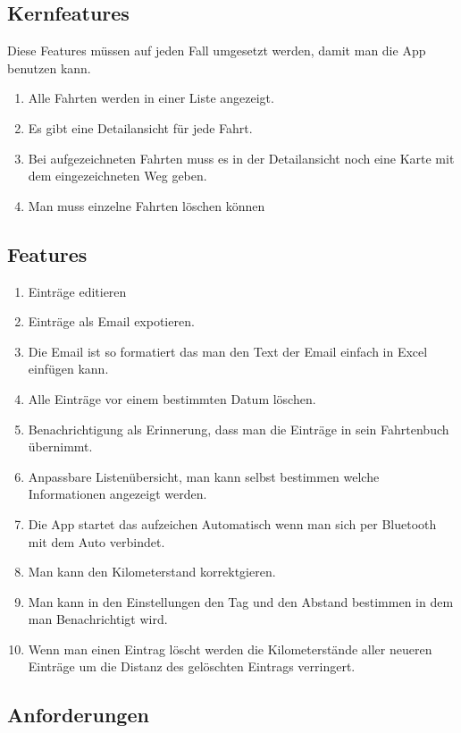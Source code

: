 \documentclass[a4paper]{article}
\begin{document}
\subsection{Kernfeatures}
Diese Features müssen auf jeden Fall umgesetzt werden, damit man die App benutzen kann. 
\begin{enumerate}
	\item Alle Fahrten werden in einer Liste angezeigt.
	\item Es gibt eine Detailansicht für jede Fahrt.
	\item Bei aufgezeichneten Fahrten muss es in der Detailansicht noch eine Karte mit dem eingezeichneten Weg geben.
	\item Man muss einzelne Fahrten löschen können
\end{enumerate}

\subsection{Features}
\begin{enumerate}
	\item Einträge editieren
	\item Einträge als Email expotieren.
	\item Die Email ist so formatiert das man den Text der Email einfach in Excel einfügen kann.
	\item Alle Einträge vor einem bestimmten Datum löschen.
	\item Benachrichtigung als Erinnerung, dass man die Einträge in sein Fahrtenbuch übernimmt.
	\item Anpassbare Listenübersicht, man kann selbst bestimmen welche Informationen angezeigt werden.
	\item Die App startet das aufzeichen Automatisch wenn man sich per Bluetooth mit dem Auto verbindet.
	\item Man kann den Kilometerstand korrektgieren.
	\item Man kann in den Einstellungen den Tag und den Abstand bestimmen in dem man Benachrichtigt wird.
	\item Wenn man einen Eintrag löscht werden die Kilometerstände aller neueren Einträge um die Distanz des gelöschten Eintrags verringert.
\end{enumerate}

\subsection{Anforderungen}
\end{document}
